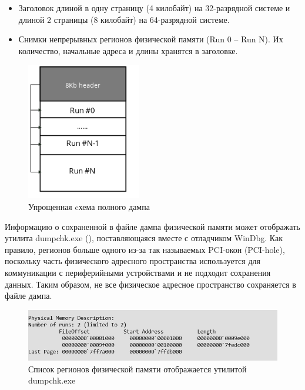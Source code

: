 \documentclass{mipt-thesis-bs}
\begin{document}
\begin{itemize}
    \item Заголовок длиной в одну страницу (4 килобайт) на 32-разрядной системе и длиной 2 страницы (8 килобайт) на 64-разрядной системе.
    \item Снимки непрерывных регионов физической памяти (Run 0 -- Run N). Их количество, начальные адреса и длины хранятся в заголовке.
\end{itemize}

\begin{figure}[h]
\begin{center}
    \includegraphics[width=5cm]{dmp_scheme1.png}
    \caption{Упрощенная cхема полного дампа}
    \label{fig:dmp-scheme}
\end{center}
\end{figure}

Информацию о сохраненной в файле дампа физической памяти может отображать утилита dumpchk.exe (), поставляющаяся вместе с отладчиком WinDbg. Как правило, регионов больше одного из-за так называемых PCI-окон (PCI-hole), поскольку часть физического адресного пространства используется для коммуникации с периферийными устройствами и не подходит сохранения данных. Таким образом, не все физическое адресное пространство сохраняется в файле дампа.

\begin{figure}[h]
\begin{center}
    \includegraphics[width=1\textwidth]{runs.png}
    \caption{Список регионов физической памяти отображается утилитой dumpchk.exe}
    \label{fig:runs}
\end{center}
\end{figure}
\end{document}
